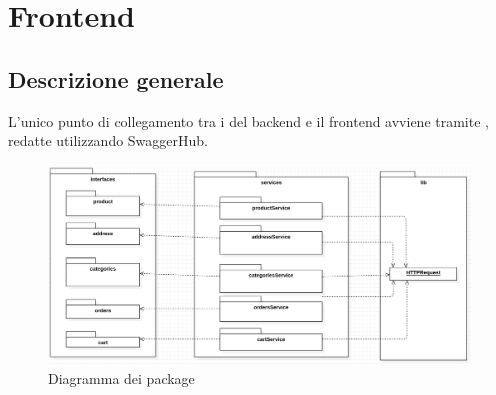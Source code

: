 \section{Frontend}
\subsection{Descrizione generale}
L'unico punto di collegamento tra i  del backend e il frontend avviene tramite , redatte utilizzando SwaggerHub.
\begin{figure}[H]
	\centering
	\includegraphics[width=\textwidth]{Immagini/DiagrammaDeiPackage.png}
	\caption{Diagramma dei package}
	\label{fig:fe-packages}
\end{figure}